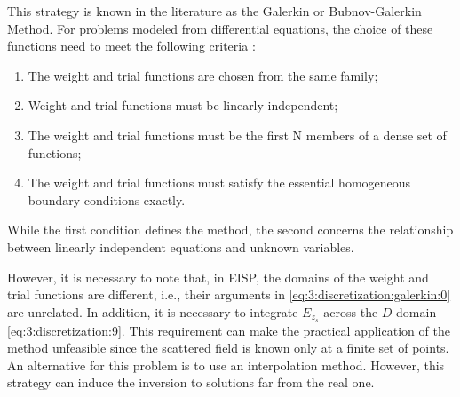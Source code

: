 			This strategy is known in the literature as the Galerkin or Bubnov-Galerkin Method. For problems modeled from differential equations, the choice of these functions need to meet the following criteria \citep{fletcher1984computational}:
			\begin{enumerate}
				\item The weight and trial functions are chosen from the same family;
				\item Weight and trial functions must be linearly independent;
				\item The weight and trial functions must be the first N members of a dense set of functions;
				\item The weight and trial functions must satisfy the essential homogeneous boundary conditions exactly.
			\end{enumerate}
			While the first condition defines the method, the second concerns the relationship between linearly independent equations and unknown variables. %
		
			However, it is necessary to note that, in EISP, the domains of the weight and trial functions are different, i.e., their arguments in \eqref{eq:3:discretization:galerkin:0} are unrelated. In addition, it is necessary to integrate $E_{z_s}$ across the $D$ domain \eqref{eq:3:discretization:9}. This requirement can make the practical application of the method unfeasible since the scattered field is known only at a finite set of points. An alternative for this problem is to use an interpolation method. However, this strategy can induce the inversion to solutions far from the real one.
			
